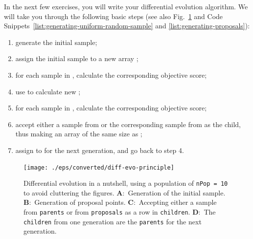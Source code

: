 In the next few exercises, you will write your differential evolution algorithm.
We will take you through the following basic steps (see also
\textsf{Fig.~\ref{fig:diff-evo-principle}} and \textsf{Code
Snippets~\ref{list:generating-uniform-random-sample}} and
\textsf{\ref{list:generating-proposals}}):
\begin{enumerate}
\item{generate the initial sample;}
\item{assign the initial sample to a new array ;}
\item{for each sample in , calculate the corresponding objective
score;}
\item{use  to calculate new ;}
\item{for each sample in , calculate the corresponding objective
score;}
\item{accept either a sample from  or the corresponding sample
from  as the child, thus making an array  of the
same size as ;}
\item{assign  to  for the next generation, and go
back to step 4.}
\end{enumerate}

\begin{figure}[htbp]
  \centering
    \texttt{[image: ./eps/converted/diff-evo-principle]}
  \caption{Differential evolution in a nutshell, using a population of
  \texttt{nPop = 10} to avoid cluttering the figures. \textbf{A}:~Generation of
  the initial sample. \textbf{B}:~Generation of proposal points.
  \textbf{C}:~Accepting either a sample from \texttt{parents} or from 
  \texttt{proposals} as a row in \texttt{children}. \textbf{D}:~The 
  \texttt{children} from one generation are the \texttt{parents} for the
  next generation.}
  \label{fig:diff-evo-principle}
\end{figure}







